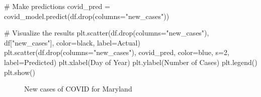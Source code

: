\documentclass[
  letterpaper,
  DIV=11,
  numbers=noendperiod]{scrreprt}
\newenvironment{Shaded}{\begin{snugshade}}{\end{snugshade}}
\newcommand{\CommentTok}[1]{\textcolor[rgb]{0.37,0.37,0.37}{#1}}
\newcommand{\DecValTok}[1]{\textcolor[rgb]{0.68,0.00,0.00}{#1}}
\newcommand{\NormalTok}[1]{\textcolor[rgb]{0.00,0.23,0.31}{#1}}
\newcommand{\OperatorTok}[1]{\textcolor[rgb]{0.37,0.37,0.37}{#1}}
\newcommand{\StringTok}[1]{\textcolor[rgb]{0.13,0.47,0.30}{#1}}
\begin{document}
\begin{Shaded}
\begin{Highlighting}[]
\CommentTok{\# Make predictions}
\NormalTok{covid\_pred }\OperatorTok{=}\NormalTok{ covid\_model.predict(df.drop(columns}\OperatorTok{=}\StringTok{"new\_cases"}\NormalTok{))}

\CommentTok{\# Visualize the results}
\NormalTok{plt.scatter(df.drop(columns}\OperatorTok{=}\StringTok{"new\_cases"}\NormalTok{), df[}\StringTok{"new\_cases"}\NormalTok{], color}\OperatorTok{=}\StringTok{\textquotesingle{}black\textquotesingle{}}\NormalTok{, label}\OperatorTok{=}\StringTok{\textquotesingle{}Actual\textquotesingle{}}\NormalTok{)}
\NormalTok{plt.scatter(df.drop(columns}\OperatorTok{=}\StringTok{"new\_cases"}\NormalTok{), covid\_pred, color}\OperatorTok{=}\StringTok{\textquotesingle{}blue\textquotesingle{}}\NormalTok{, s}\OperatorTok{=}\DecValTok{2}\NormalTok{, label}\OperatorTok{=}\StringTok{\textquotesingle{}Predicted\textquotesingle{}}\NormalTok{)}
\NormalTok{plt.xlabel(}\StringTok{\textquotesingle{}Day of Year\textquotesingle{}}\NormalTok{)}
\NormalTok{plt.ylabel(}\StringTok{\textquotesingle{}Number of Cases\textquotesingle{}}\NormalTok{)}
\NormalTok{plt.legend()}
\NormalTok{plt.show()}
\end{Highlighting}
\end{Shaded}

\begin{figure}


\caption{\label{fig-covid-predictions}New cases of COVID for Maryland}

\end{figure}%
\end{document}

